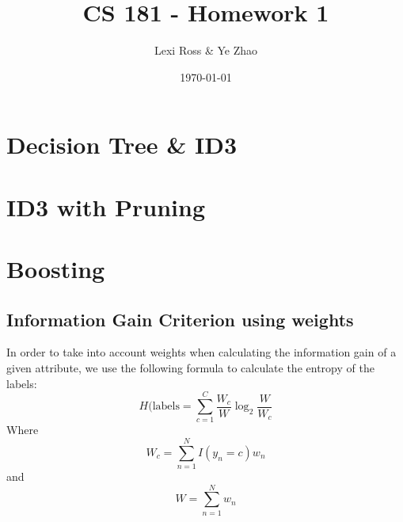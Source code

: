 \documentclass[11pt]{article}
\title{\bf CS 181 - Homework 1}
\date{\today}
\author{Lexi Ross \& Ye Zhao}
\begin{document}
\maketitle
\section{Decision Tree \& ID3}

\section{ID3 with Pruning}

\section{Boosting}

\subsection{Information Gain Criterion using weights}
In order to take into account weights when calculating the information gain of a given attribute, we use the following formula to calculate the entropy of the labels:
$$H(\text{labels}=\sum_{c=1}^{C}\frac{W_c}{W}\log_2\frac{W}{W_c}$$
Where $$W_c = \sum_{n=1}^{N}I(y_n=c)w_n$$ and $$W=\sum_{n=1}^{N}w_n$$
\end{document}
